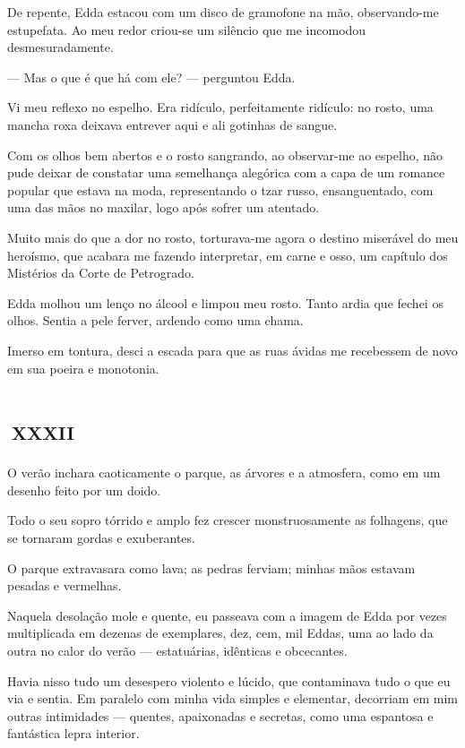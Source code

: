 De repente, Edda estacou com um disco de gramofone na mão, observando-me estupefata. Ao meu redor criou-se um silêncio que me incomodou desmesuradamente. 

--- Mas o que é que há com ele? --- perguntou Edda. 

Vi meu reflexo no espelho. Era ridículo, perfeitamente ridículo: no rosto, uma mancha roxa deixava entrever aqui e ali gotinhas de sangue.

Com os olhos bem abertos e o rosto sangrando, ao observar-me ao espelho, não pude deixar de constatar uma semelhança alegórica com a capa de um romance popular que estava na moda, representando o tzar russo, ensanguentado, com uma das mãos no maxilar, logo após sofrer um atentado.

Muito mais do que a dor no rosto, torturava-me agora o destino miserável do meu heroísmo, que acabara me fazendo interpretar, em carne e osso, um capítulo dos Mistérios da Corte de Petrogrado. 

Edda molhou um lenço no álcool e limpou meu rosto. Tanto ardia que fechei os olhos. Sentia a pele ferver, ardendo como uma chama.

Imerso em tontura, desci a escada para que as ruas ávidas me recebessem de novo em sua poeira e monotonia.


\chapter*{\small{}\,\Large\centering\textsc{xxxii}\,\small{}}

O verão inchara caoticamente o parque, as árvores e a atmosfera, como em um desenho feito por um doido.

Todo o seu sopro tórrido e amplo fez crescer monstruosamente as folhagens, que se tornaram gordas e exuberantes.

O parque extravasara como lava; as pedras ferviam; minhas mãos estavam pesadas e vermelhas.

Naquela desolação mole e quente, eu passeava com a imagem de Edda por vezes multiplicada em dezenas de exemplares, dez, cem, mil Eddas, uma ao lado da outra no calor do verão --- estatuárias, idênticas e obcecantes.

Havia nisso tudo um desespero violento e lúcido, que contaminava tudo o que eu via e sentia. Em paralelo com minha vida simples e elementar, decorriam em mim outras intimidades --- quentes, apaixonadas e secretas, como uma espantosa e fantástica lepra interior.

